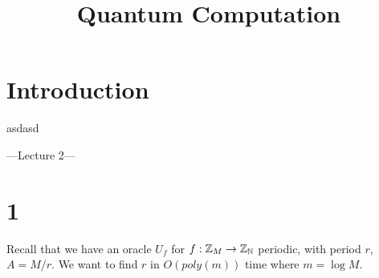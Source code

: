 \documentclass[a4paper]{article}
\begin{document}
\title{Quantum Computation}

\maketitle

\newpage

\tableofcontents

\newpage

\section{Introduction}
asdasd

\newpage

---Lecture 2---

\section{1}

Recall that we have an oracle $U_f$ for $f:\mathbb{Z}_M \to \mathbb{Z}_{\mathbb{N}}$ periodic, with period $r$, $A=M/r$. We want to find $r$ in $O(poly(m))$ time where $m=\log M$.
\end{document}
